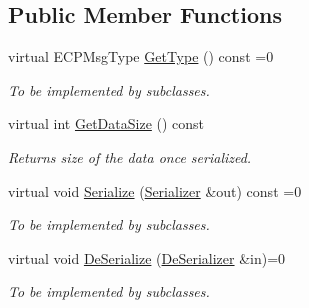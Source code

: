 \subsection*{Public Member Functions}
\begin{DoxyCompactItemize}
\item 
\hypertarget{class_common_1_1_e_c_p_message_ab89759d2977bde718b296573c308e1a0}{virtual E\-C\-P\-Msg\-Type \hyperlink{class_common_1_1_e_c_p_message_ab89759d2977bde718b296573c308e1a0}{Get\-Type} () const =0}\label{class_common_1_1_e_c_p_message_ab89759d2977bde718b296573c308e1a0}

\begin{DoxyCompactList}\small\item\em To be implemented by subclasses. \end{DoxyCompactList}\item 
\hypertarget{class_common_1_1_e_c_p_message_a9de0bc0ffea7a980b4f938d753c1e9f4}{virtual int \hyperlink{class_common_1_1_e_c_p_message_a9de0bc0ffea7a980b4f938d753c1e9f4}{Get\-Data\-Size} () const }\label{class_common_1_1_e_c_p_message_a9de0bc0ffea7a980b4f938d753c1e9f4}

\begin{DoxyCompactList}\small\item\em Returns size of the data once serialized. \end{DoxyCompactList}\item 
\hypertarget{class_common_1_1_e_c_p_message_a9288d23442703c5a58b8e56e0dd9ca53}{virtual void \hyperlink{class_common_1_1_e_c_p_message_a9288d23442703c5a58b8e56e0dd9ca53}{Serialize} (\hyperlink{class_common_1_1_serializer}{Serializer} \&out) const =0}\label{class_common_1_1_e_c_p_message_a9288d23442703c5a58b8e56e0dd9ca53}

\begin{DoxyCompactList}\small\item\em To be implemented by subclasses. \end{DoxyCompactList}\item 
\hypertarget{class_common_1_1_e_c_p_message_afed137550ebd758400d93f7e9e019a44}{virtual void \hyperlink{class_common_1_1_e_c_p_message_afed137550ebd758400d93f7e9e019a44}{De\-Serialize} (\hyperlink{class_common_1_1_de_serializer}{De\-Serializer} \&in)=0}\label{class_common_1_1_e_c_p_message_afed137550ebd758400d93f7e9e019a44}

\begin{DoxyCompactList}\small\item\em To be implemented by subclasses. \end{DoxyCompactList}\end{DoxyCompactItemize}
